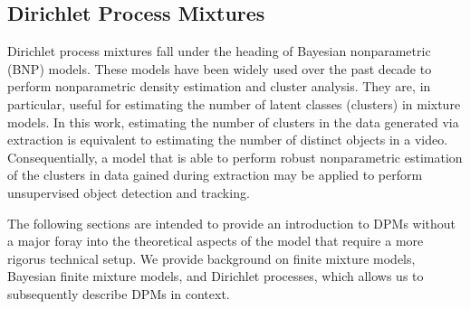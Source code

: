 \documentclass[twocolumn, final]{svjour3}
\begin{document}






\subsection{Dirichlet Process Mixtures}
\label{sec:dpm}

Dirichlet process mixtures fall under the heading of Bayesian nonparametric (BNP) models. These models have been widely used over the past decade to perform nonparametric density estimation and cluster analysis. They are, in particular, useful for estimating the number of latent classes (clusters) in mixture models. In this work, estimating the number of clusters in the data generated via extraction is equivalent to estimating the number of distinct objects in a video. Consequentially, a model that is able to perform robust nonparametric estimation of the clusters in data gained during extraction may be applied to perform unsupervised object detection and tracking.

The following sections are intended to provide an introduction to DPMs without a major foray into the theoretical aspects of the model that require a more rigorus technical setup. We provide background on finite mixture models, Bayesian finite mixture models, and Dirichlet processes, which allows us to subsequently describe DPMs in context. 
\end{document}
